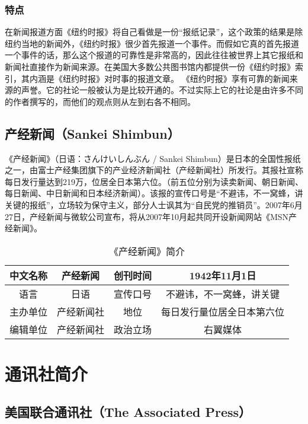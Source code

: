 \documentclass[a4paper,openany]{book}
\begin{document}
\subsubsection{特点}

在新闻报道方面《纽约时报》将自己看做是一份“报纸记录”，这个政策的结果是除纽约当地的新闻外，《纽约时报》很少首先报道一个事件。而假如它真的首先报道一个事件的话，那么这个报道的可靠性是非常高的，因此往往被世界上其它报纸和新闻社直接作为新闻来源。在美国大多数公共图书馆内都提供一份《纽约时报》索引，其内涵是《纽约时报》对时事的报道文章。 《纽约时报》享有可靠的新闻来源的声誉。它的社论一般被认为是比较开通的。不过实际上它的社论是由许多不同的作者撰写的，而他们的观点则从左到右各不相同。

\subsection{产经新闻（Sankei Shimbun）}

《产经新闻》（日语：さんけいしんぶん / Sankei Shimbun）是日本的全国性报纸之一，由富士产经集团旗下的产业经济新闻社（产经新闻社）所发行。其报社宣称每日发行量达到219万，位居全日本第六位。（前五位分别为读卖新闻、朝日新闻、每日新闻、中日新闻和日本经济新闻）。该报的宣传口号是“不避讳，不一窝蜂，讲关键的报纸”，立场较为保守主义，部分人士讽其为“自民党的推销员”。2007年6月27日，产经新闻与微软公司宣布，将从2007年10月起共同开设新闻网站《MSN产经新闻》。

\begin{table}[ht]
\centering
\setlength{\belowcaptionskip}{5pt}
\caption{《产经新闻》简介}
\begin{tabular}{|c|c|c|c|}
\hline
中文名称   & 产经新闻  & 创刊时间   & 1942年11月1日     \\ \hline
语言 & 日语    & 宣传口号   & 不避讳，不一窝蜂，讲关键   \\ \hline
主办单位   & 产经新闻社 & 地位 & 每日发行量位居全日本第六位 \\ \hline
编辑单位   & 产经新闻社 & 政治立场   & 右翼媒体           \\ \hline
\end{tabular}
\end{table}

\section{通讯社简介}

\subsection{美国联合通讯社（The Associated Press）}
\end{document}
